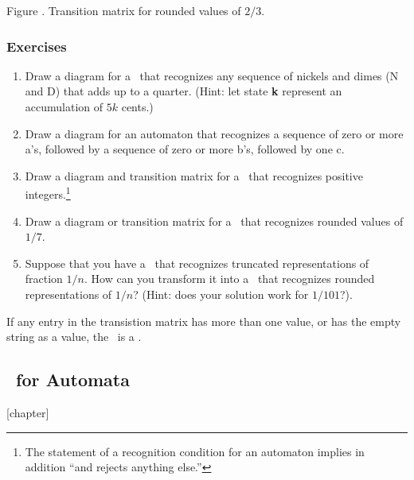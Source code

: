 \begin{center}
Figure \thefigure. Transition matrix for rounded values of $2/3$.
\end{center}


\subsubsection{Exercises}
\begin{enumerate}\setcounter{enumi}{\value{RunningExercise}}

\item  Draw a diagram for a \dfa\ that recognizes any sequence of
nickels and dimes (N and D) that adds up to a quarter. 
(Hint: let state {\bf k} represent an accumulation of $5k$ cents.)

\item Draw a diagram for an automaton that recognizes a sequence
of zero or more a's, followed by a sequence of zero or more b's,
followed by one c.

\item 
Draw a diagram and transition matrix for a \dfa\ that recognizes
positive integers.\footnote{The statement of a recognition condition
for an automaton implies in addition ``and rejects anything else.''}

\item Draw a diagram or transition matrix for a \dfa\ that recognizes 
rounded values of $1/7$.

\item  Suppose that you have a \dfa\ that recognizes truncated
representations of fraction $1/n$.  
How can you transform it into a \dfa\ that 
recognizes rounded representations of $1/n$?  
(Hint: does your solution work for $1/101$?).

\setcounter{abcexercise}{\value{enumi}}

\setcounter{RunningExercise}{\value{enumi}}
\end{enumerate}

If any entry in the transistion matrix has more than one value,
or has the empty string as a value, the \fa\ is a \nfa.  

\subsection{\cfg\ for Automata}

{}[chapter]
\setcounter{FAschema}{\value{table}}

